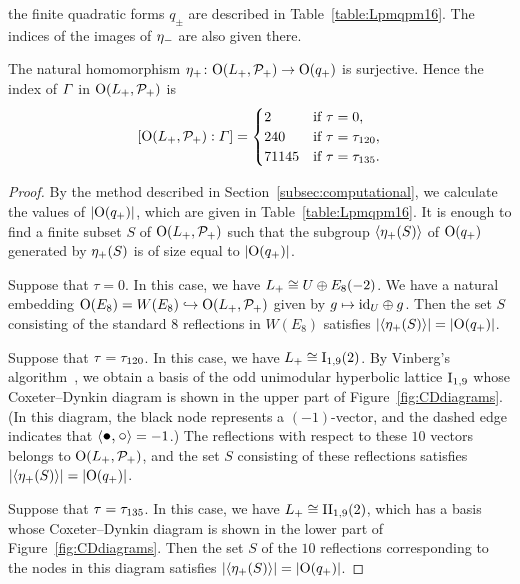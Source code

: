 \documentclass{amsart} %
\begin{document}
the finite quadratic forms $q_{\pm}$ are described in Table~\ref{table:Lpmqpm16}.
The indices of the images of ${\eta}_{-}$ are also given there.
%
\begin{proposition}\label{prop:etaplussurj16}
The natural homomorphism ${\eta}_{+}\colon \mathord{\mathrm{O}}(L_{+}, \mathord{\mathcal{P}}_{+})\to \mathord{\mathrm{O}}(q_{+})$ is surjective.
Hence the index of $\varGamma$ in $\mathord{\mathrm{O}}(L_{+}, \mathord{\mathcal{P}}_{+})$ is
\[
[\mathord{\mathrm{O}}(L_{+}, \mathord{\mathcal{P}}_{+}): \varGamma]=
\begin{cases}
2 & \textrm{if $\tau=0$}, \\
240 & \textrm{if $\tau= \tau_{120}$}, \\
71145 & \textrm{if $\tau= \tau_{135}$}.
\end{cases}
\]
\end{proposition}
%
\begin{proof}
By the method described in Section~\ref{subsec:computational},
we calculate the values of $|\mathord{\mathrm{O}}(q_{+})|$, 
which are given in Table~\ref{table:Lpmqpm16}.
It is enough to find a finite subset $S$ 
of $\mathord{\mathrm{O}}(L_{+}, \mathord{\mathcal{P}}_{+})$ such that 
the subgroup $\langle {{\eta}_{+}(S)} \rangle$ of $\mathord{\mathrm{O}}(q_{+})$
generated by ${\eta}_{+}(S)$ is of size equal to $|\mathord{\mathrm{O}}(q_{+})|$.
\par
Suppose that $\tau=0$.
In this case,
we have $L_{+}\cong U\oplus E_8(-2)$.
We have a natural embedding $\mathord{\mathrm{O}}(E_8)=W(E_8)\hookrightarrow \mathord{\mathrm{O}}(L_{+}, \mathord{\mathcal{P}}_{+})$
given by $g\mapsto \mathord{\mathrm{id}}_U \oplus g$.
Then %
the set $S$ consisting of the standard $8$ reflections in $W(E_8)$ 
satisfies $|\langle {{\eta}_{+}(S)} \rangle|=|\mathord{\mathrm{O}}(q_{+})|$.
%
\par
Suppose that $\tau= \tau_{120}$.
In this case,
we have $L_{+}\cong \mathrm{I}_{1, 9}(2)$.
By Vinberg’s algorithm~\cite{Vinberg1985}, 
we obtain a basis of the odd unimodular hyperbolic lattice $\mathrm{I}_{1,9}$ 
whose Coxeter–Dynkin diagram is shown in the upper part of Figure~\ref{fig:CDdiagrams}. 
(In this diagram, 
the black node represents a $(-1)$-vector, and 
the dashed edge indicates that 
$\langle \hbox{\large{$\bullet, \circ$}} \rangle=-1$.)
The reflections 
with respect to these $10$ vectors
belongs to $\mathord{\mathrm{O}}(L_{+}, \mathord{\mathcal{P}}_{+})$, and 
 the set $S$ consisting of these  reflections
satisfies $|\langle {{\eta}_{+}(S)} \rangle|=|\mathord{\mathrm{O}}(q_{+})|$.
%
\par
Suppose that $\tau= \tau_{135}$.
In this case,
we have $L_{+}\cong \mathrm{II}_{1, 9}(2)$,
which 
has a basis 
whose Coxeter–Dynkin diagram is shown in the lower part of Figure~\ref{fig:CDdiagrams}. 
Then the set $S$ of the
 $10$ reflections corresponding to the nodes in this diagram
satisfies $|\langle {{\eta}_{+}(S)} \rangle|=|\mathord{\mathrm{O}}(q_{+})|$.

\end{proof}
\end{document}
